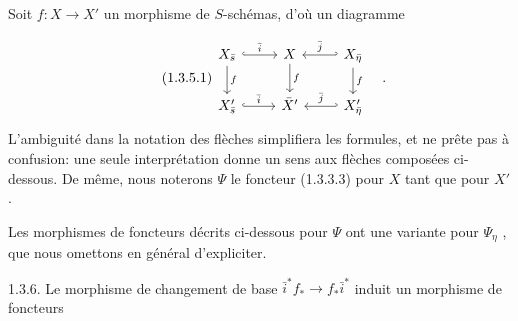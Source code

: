 Soit $f : X \longrightarrow X'$ un morphisme de $S$-schémas, d'où un diagramme

\begin{equation}\tag{1.3.5.1}
\begin{tikzcd}
X_{\bar s} \arrow[r, hook, "\bar i"] \arrow[d, "f"] & X \arrow[d, "f"] & X_{\bar \eta} \arrow[l, hook', "\bar j"'] \arrow[d, "f"] \\
X'_{\bar s} \arrow[r, hook, "\bar i"] & \bar X' & X'_{\bar \eta} \arrow[l, hook', "\bar j"']
\end{tikzcd}\quad .
\end{equation}
L'ambiguité dans la notation des flèches simplifiera les formules, et ne prête pas à confusion: une seule interprétation donne un sens aux flèches composées ci-dessous. De même, nous noterons $\Psi$ le foncteur (1.3.3.3) pour $X$ tant que pour $X'$ .

Les morphismes de foncteurs décrits ci-dessous pour $\Psi$ ont une variante pour $\Psi_\eta$ , que nous omettons en général d'expliciter.



1.3.6. Le morphisme de changement de base $\bar{i}^* f_* \longrightarrow f_* \bar{i}^*$ induit un morphisme de foncteurs

